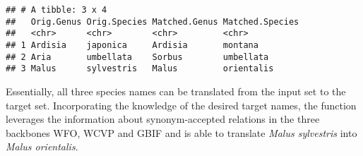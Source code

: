 \documentclass[
  11pt,
]{article}
\begin{document}
\begin{verbatim}
## # A tibble: 3 x 4
##   Orig.Genus Orig.Species Matched.Genus Matched.Species
##   <chr>      <chr>        <chr>         <chr>          
## 1 Ardisia    japonica     Ardisia       montana        
## 2 Aria       umbellata    Sorbus        umbellata      
## 3 Malus      sylvestris   Malus         orientalis
\end{verbatim}

\normalsize

Essentially, all three species names can be translated from the input
set to the target set. Incorporating the knowledge of the desired target
names, the function leverages the information about synonym-accepted
relations in the three backbones WFO, WCVP and GBIF and is able to
translate \emph{Malus sylvestris} into \emph{Malus orientalis}.
\end{document}
